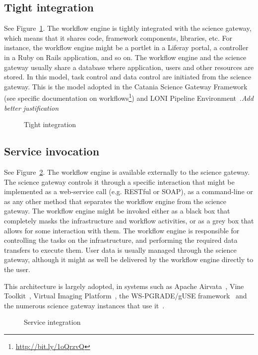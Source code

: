 \documentclass[preprint,3p,twocolumn]{elsarticle}
\newcommand{\todo}[1]{\color{blue}\xspace\emph{#1}\xspace\color{black}}
\begin{document}
\subsection{Tight integration}

See Figure~\ref{archi:tight}. The workflow engine is tightly
integrated with the science gateway, which means that it shares code,
framework components, libraries, etc. For instance, the workflow
engine might be a portlet in a Liferay portal, a controller in a Ruby
on Rails application, and so on. The workflow engine and the science
gateway usually share a database where application, users and other
resources are stored. In this model, task control and data control are
initiated from the science gateway. This is the model adopted in the
Catania Science Gateway Framework~\cite{Ardizzone2012} (see specific
documentation on
workflows\footnote{\url{http://bit.ly/1oQrzvQ}})
and LONI Pipeline Environment~\cite{dinov2009efficient}.\todo{Add better justification}

\begin{figure}
\centering
\def\svgwidth{0.5\columnwidth}

\caption{Tight integration}
\label{archi:tight}
\end{figure}

\subsection{Service invocation}

See Figure~\ref{archi:service}. The workflow engine is available
externally to the science gateway. The science gateway controls it
through a specific interaction that might be implemented as a
web-service call (e.g. RESTful or SOAP), as a command-line or as any
other method that separates the workflow engine from the science
gateway. The workflow engine might be invoked either as a black box
that completely masks the infrastructure and workflow activities, or
as a grey box that allows for some interaction with them.  The
workflow engine is responsible for controlling the tasks on the
infrastructure, and performing the required data transfers to execute
them. User data is usually managed through the science gateway,
although it might as well be delivered by the workflow engine directly
to the user.

This architecture is largely adopted, in systems such as Apache
Airvata~\cite{marru2011apache}, Vine
Toolkit~\cite{DBLP:journals/scpe/SzejnfeldDKKKKLPTWDNW10}, Virtual
Imaging Platform~\cite{GLAT-13}, the WS-PGRADE/gUSE
framework~\cite{Kacsuk2012} and the numerous science gateway instances
that use it~\cite{kacsuk2014science}.
\begin{figure}
\centering
\def\svgwidth{0.5\columnwidth}

\caption{Service integration}
\label{archi:service}
\end{figure}
\end{document}
